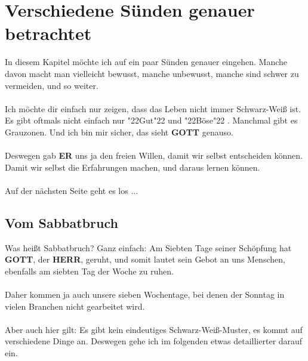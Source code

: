\documentclass[12pt,a5paper]{article}
\newcommand{\Er}[0]{\textbf{ER}}
\newcommand{\Gott}[0]{\textbf{GOTT}}
\newcommand{\Herr}[0]{\textbf{HERR}}
\newcommand{\q}[1]{\char"22{#1}\char"22 }
\begin{document}
	\newpage
	\section{Verschiedene S\"unden genauer betrachtet}
		In diesem Kapitel m\"ochte ich auf ein paar S\"unden genauer eingehen.
		Manche davon macht man vielleicht bewusst,
		manche unbewusst,
		manche sind schwer zu vermeiden,
		und so weiter.
		\\
		\\
		Ich m\"ochte dir einfach nur zeigen,
		dass das Leben nicht immer Schwarz-Wei{\ss} ist.
		Es gibt oftmals nicht einfach nur \q{Gut} und \q{B\"ose}.
		Manchmal gibt es Grauzonen.
		Und ich bin mir sicher,
		das sieht {\Gott} genauso.
		\\
		\\
		Deswegen gab {\Er} uns ja den freien Willen,
		damit wir selbst entscheiden k\"onnen.
		Damit wir selbst die Erfahrungen machen,
		und daraus lernen k\"onnen.
		\\
		\\
		Auf der n\"achsten Seite geht es los ...

	\newpage
	\subsection{Vom Sabbatbruch}
		Was hei{\ss}t Sabbatbruch?
		Ganz einfach:
		Am Siebten Tage seiner Sch\"opfung hat {\Gott},
		der {\Herr},
		geruht,
		und somit lautet sein Gebot an uns Menschen,
		ebenfalls am siebten Tag der Woche zu ruhen.
		\\
		\\
		Daher kommen ja auch unsere sieben Wochentage,
		bei denen der Sonntag in vielen Branchen nicht gearbeitet wird.
		\\
		\\
		Aber auch hier gilt:
		Es gibt kein eindeutiges Schwarz-Wei{\ss}-Muster,
		es kommt auf verschiedene Dinge an.
		Deswegen gehe ich im folgenden etwas detaillierter darauf ein.
	
\end{document}
